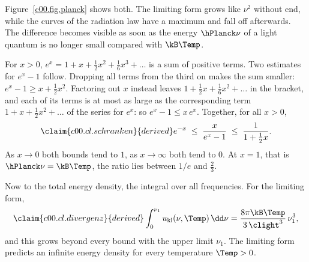 Figure~\ref{c00.fig.planck} shows both. The limiting form grows like $\nu^2$ without end,
while the curves of the radiation law have a maximum and fall off afterwards. The difference
becomes visible as soon as the energy $\hPlanck\nu$ of a light quantum is no longer small
compared with $\kB\Temp$.

\begin{vertiefung}[id=c00.v1,
    titel={The limiting form, precisely},
    wozu={The Core says that the ratio $x/(e^x-1)$ is close to $1$ for small $x$ and falls
      to $0$ for large $x$. Here are two bounds that prove it, and a consequence: the
      limiting form predicts an infinite energy density, the radiation law a finite one.},
    voraussetzung={Core up to equation~\eqref{c00.eq.grenzform}; the exponential series and
      integrals of powers. The rest of the chapter does not need this block.},
    zurueck={For $\hPlanck\nu$ small compared with $\kB\Temp$ the radiation law and the
      limiting form agree approximately, their ratio tends to $1$; for large frequencies the
      limiting form is wrong, and arbitrarily wrong.}]
  For $x > 0$, $e^x = 1 + x + \tfrac12 x^2 + \tfrac16 x^3 + \dots$ is a sum of positive
  terms. Two estimates for $e^x - 1$ follow. Dropping all terms from the third on makes the
  sum smaller: $e^x - 1 \geq x + \tfrac12 x^2$. Factoring out $x$ instead leaves
  $1 + \tfrac12 x + \tfrac16 x^2 + \dots$ in the bracket, and each of its terms is at most as
  large as the corresponding term $1 + x + \tfrac12 x^2 + \dots$ of the series for $e^x$:
  so $e^x - 1 \leq x\,e^x$. Together, for all $x > 0$,
  \begin{equation}\label{c00.eq.schranken}\claim{c00.cl.schranken}{derived}
    e^{-x} \;\leq\; \frac{x}{e^{x} - 1} \;\leq\; \frac{1}{1 + \tfrac12 x} .
  \end{equation}
  As $x \to 0$ both bounds tend to $1$, as $x \to \infty$ both tend to $0$. At $x = 1$, that
  is $\hPlanck\nu = \kB\Temp$, the ratio lies between $1/e$ and $\tfrac23$.

  Now to the total energy density, the integral over all frequencies. For the limiting form,
  \begin{equation}\label{c00.eq.divergenz}\claim{c00.cl.divergenz}{derived}
    \int_0^{\nu_1} u_{\mathrm{kl}}(\nu, \Temp)\,\dd\nu
    = \frac{8\pi \kB \Temp}{3\,\clight^3}\,\nu_1^3 ,
  \end{equation}
  and this grows beyond every bound with the upper limit $\nu_1$. The limiting form predicts
  an infinite energy density for every temperature $\Temp > 0$.


\end{vertiefung}
